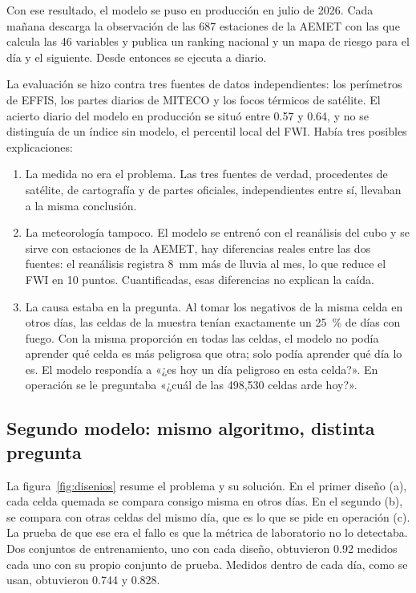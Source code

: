 \documentclass[10pt,a4paper]{article}
\begin{document}
Con ese resultado, el modelo se puso en producción en julio de 2026. Cada
mañana descarga la observación de las 687 estaciones de la AEMET con las que
calcula las 46 variables y publica un ranking nacional y un mapa de riesgo para
el día y el siguiente. Desde entonces se ejecuta a diario.

La evaluación se hizo contra tres fuentes de datos independientes: los
perímetros de EFFIS, los partes diarios de MITECO y los focos térmicos de
satélite. El acierto diario del modelo en producción se situó entre 0.57 y
0.64, y no se distinguía de un índice sin modelo, el percentil local del FWI.
Había tres posibles explicaciones:

\begin{enumerate}
  \item La medida no era el problema. Las tres fuentes de verdad, procedentes
  de satélite, de cartografía y de partes oficiales, independientes entre sí,
  llevaban a la misma conclusión.
  \item La meteorología tampoco. El modelo se entrenó con el reanálisis del
  cubo y se sirve con estaciones de la AEMET, hay diferencias reales entre las
  dos fuentes: el reanálisis registra 8~mm más de lluvia al mes, lo que reduce
  el FWI en 10 puntos. Cuantificadas, esas diferencias no explican la caída.
  \item La causa estaba en la pregunta. Al tomar los negativos de la misma
  celda en otros días, las celdas de la muestra tenían exactamente un 25~\% de
  días con fuego. Con la misma proporción en todas las celdas, el modelo no
  podía aprender qué celda es más peligrosa que otra; solo podía aprender qué
  día lo es. El modelo respondía a «¿es hoy un día peligroso en esta celda?».
  En operación se le preguntaba «¿cuál de las 498,530 celdas arde hoy?».
\end{enumerate}

\subsection{Segundo modelo: mismo algoritmo, distinta pregunta}

La figura~\ref{fig:disenios} resume el problema y su solución. En el primer
diseño (a), cada celda quemada se compara consigo misma en otros días. En el
segundo (b), se compara con otras celdas del mismo día, que es lo que se pide
en operación (c). La prueba de que ese era el fallo es que la métrica de
laboratorio no lo detectaba. Dos conjuntos de entrenamiento, uno con cada
diseño, obtuvieron 0.92 medidos cada uno con su propio conjunto de prueba.
Medidos dentro de cada día, como se usan, obtuvieron 0.744 y 0.828.
\end{document}
